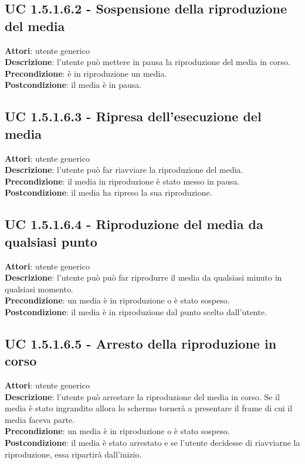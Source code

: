 	\subsection{UC 1.5.1.6.2 - Sospensione della riproduzione del media}{
		\label{uc1.5.1.6.2}
		\textbf{Attori}: utente generico \\
		\textbf{Descrizione}: l'utente può mettere in pausa la riproduzione del media in corso. \\
		\textbf{Precondizione}: è in riproduzione un media.	\\
		\textbf{Postcondizione}: il media è in pausa.	\\
	}
	\subsection{UC 1.5.1.6.3 - Ripresa dell'esecuzione del media}{
		\label{uc1.5.1.6.3}
		\textbf{Attori}: utente generico \\
		\textbf{Descrizione}: l'utente può far riavviare la riproduzione del media. \\
		\textbf{Precondizione}: il media in riproduzione è stato messo in pausa.	\\
		\textbf{Postcondizione}: il media ha ripreso la sua riproduzione.	\\
	}
	\subsection{UC 1.5.1.6.4 - Riproduzione del media da qualsiasi punto}{
		\label{uc1.5.1.6.4}
		\textbf{Attori}: utente generico \\
		\textbf{Descrizione}: l'utente può può far riprodurre il media da qualsiasi minuto in qualsiasi momento. \\
		\textbf{Precondizione}: un media è in riproduzione o è stato sospeso.	\\
		\textbf{Postcondizione}: il media è in riproduzione dal punto scelto dall'utente.	\\
	}
	\subsection{UC 1.5.1.6.5 - Arresto della riproduzione in corso}{
		\label{uc1.5.1.6.5}
		\textbf{Attori}: utente generico \\
		\textbf{Descrizione}: l'utente può arrestare la riproduzione del media in corso. Se il media è stato ingrandito allora lo schermo tornerà a presentare il frame di cui il media faceva parte. \\
		\textbf{Precondizione}: un media è in riproduzione o è stato sospeso.	\\
		\textbf{Postcondizione}: il media è stato arrestato e se l'utente decidesse di riavviarne la riproduzione, essa ripartirà dall'inizio.	\\
	}
